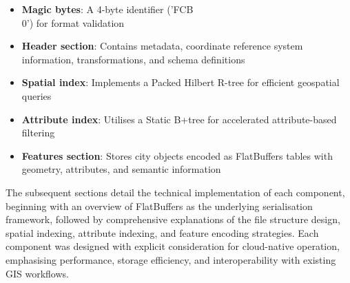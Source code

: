 \begin{itemize}
    \item \textbf{Magic bytes}: A 4-byte identifier ('FCB\\0') for format validation
    \item \textbf{Header section}: Contains metadata, coordinate reference system information, transformations, and schema definitions
    \item \textbf{Spatial index}: Implements a Packed Hilbert R-tree for efficient geospatial queries
    \item \textbf{Attribute index}: Utilises a Static B+tree for accelerated attribute-based filtering
    \item \textbf{Features section}: Stores city objects encoded as FlatBuffers tables with geometry, attributes, and semantic information
\end{itemize}

The subsequent sections detail the technical implementation of each component, beginning with an overview of FlatBuffers as the underlying serialisation framework, followed by comprehensive explanations of the file structure design, spatial indexing, attribute indexing, and feature encoding strategies. Each component was designed with explicit consideration for cloud-native operation, emphasising performance, storage efficiency, and interoperability with existing GIS workflows.

